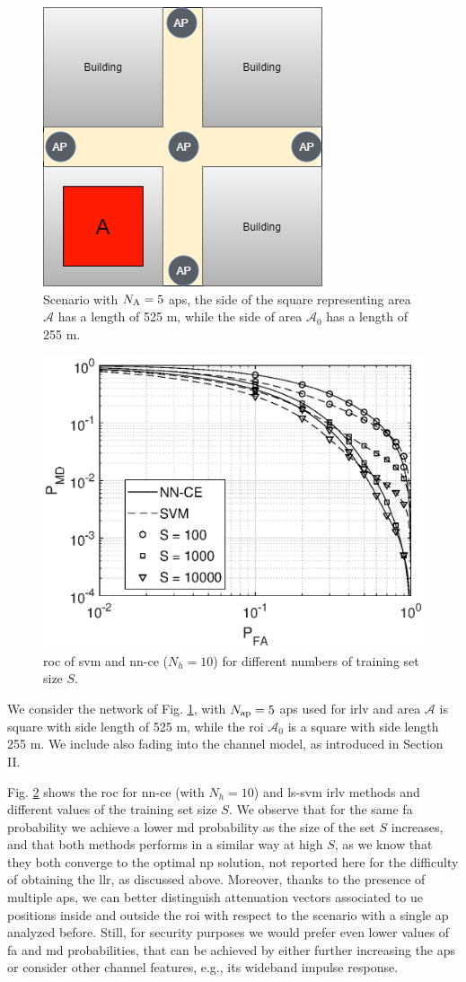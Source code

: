 \documentclass[draftcls,onecolumn,12pt]{IEEEtran}
\begin{document}
\begin{figure}[t]
    \centering
    \includegraphics[width=0.5\columnwidth]{scenario2.png}
    \caption{Scenario with $N_{\rm A} =5$ \acp{ap}, the side of the square representing area $\mathcal A$ has a length of 525 m, while the side of area $\mathcal A_0$ has a length of 255 m.} 
    \label{fig:mBS}
\end{figure}
\begin{figure}[t]
    \centering
    \includegraphics[width=0.6\columnwidth]{res_avg_nTrain_kf1.eps}
    \caption{\ac{roc} of \ac{svm} and \ac{nn}-\ac{ce} ($N_h = 10$) for different numbers of training set size $S$.}
    \label{fig:kf1}
\end{figure}

We consider the network of Fig. \ref{fig:mBS}, with $N_{\rm ap}=5$ \acp{ap} used for \ac{irlv} and area $\mathcal A$ is square with side length of 525 m, while the \ac{roi} $\mathcal A_0$ is a square with side length 255 m. 
We include also fading into the channel model, as introduced in Section II.

Fig. \ref{fig:kf1} shows the \ac{roc} for \ac{nn}-\ac{ce}  (with $N_h = 10$) and \ac{ls}-\ac{svm} \ac{irlv} methods and different values of the training set size $S$. We observe that for the same  \ac{fa} probability  we achieve a lower \ac{md} probability as the size of the set $S$ increases, and that both methods performs in a similar way at high $S$, as we know that they both converge to the optimal \ac{np} solution, not reported here for the difficulty of obtaining the \ac{llr}, as discussed above. Moreover, thanks to the presence of multiple \acp{ap}, we can better distinguish attenuation vectors associated to \ac{ue} positions inside and outside the \ac{roi} with respect to the scenario with a single \ac{ap} analyzed before. Still, for security purposes we would prefer even lower values of \ac{fa} and \ac{md} probabilities, that can be achieved by either further increasing the \acp{ap} or consider other channel features, e.g., its wideband impulse response. 
\end{document}
